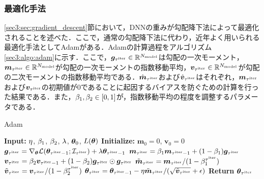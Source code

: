 \documentclass[12pt]{jarticle}
\numberwithin{equation}{section}    %
\numberwithin{figure}{section}      %
\numberwithin{table}{section}      %
\begin{document}
\subsubsection{最適化手法}
\label{sec3:sec:optimizer}
\ref{sec3:sec:gradient_descent}節において，DNNの重みが勾配降下法によって最適化されることを述べた．ここで，通常の勾配降下法に代わり，近年よく用いられる最適化手法としてAdam\cite{kingma2014adam}がある．Adamの計算過程をアルゴリズム\ref{sec3:algo:adam}に示す．ここで，$\bm{g}_{\tau^{\text{iter}}} \in \mathbb{R}^{N_{\text{model}}}$は勾配の一次モーメント，$\bm{m}_{\tau^{\text{iter}}} \in \mathbb{R}^{N_{\text{model}}}$が勾配の一次モーメントの指数移動平均，$\bm{v}_{\tau^{\text{iter}}} \in \mathbb{R}^{N_{\text{model}}}$が勾配の二次モーメントの指数移動平均である．$\hat{\bm{m}}_{\tau^{\text{iter}}}$および$\hat{\bm{v}}_{\tau^{\text{iter}}}$はそれぞれ，$\bm{m}_{\tau^{\text{iter}}}$および$\bm{v}_{\tau^{\text{iter}}}$の初期値が0であることに起因するバイアスを防ぐための計算を行った結果である．また，$\beta_{1}, \beta_{2} \in [0, 1]$が，指数移動平均の程度を調整するパラメータである．
\begin{algorithm}
    \caption{Adam}
    \label{sec3:algo:adam}
    \begin{algorithmic}[1]
        \State \textbf{Input:} $\eta$, $\beta_{1}$, $\beta_{2}$, $\lambda$, $\bm{\theta}_{0}$, $L(\bm{\theta})$
        \State \textbf{Initialize:} $\bm{m}_{0} = 0$, $\bm{v}_{0} = 0$
        \State $\bm{g}_{\tau^{\text{iter}}} = \nabla_{\bm{\theta}} \mathcal{L}(\bm{\theta}_{\tau^{\text{iter}} - 1}; \mathcal{I}_{\tau^{\text{iter}}}) + \lambda \bm{\theta}_{\tau^{\text{iter}}-1}$
        \State $\bm{m}_{\tau^{\text{iter}}} = \beta_{1} \bm{m}_{\tau^{\text{iter}}-1} + (1 - \beta_{1}) \bm{g}_{\tau^{\text{iter}}}$
        \State $\bm{v}_{\tau^{\text{iter}}} = \beta_{2} \bm{v}_{\tau^{\text{iter}}-1} + (1 - \beta_{2}) \bm{g}_{\tau^{\text{iter}}} \odot \bm{g}_{\tau^{\text{iter}}}$
        \State $\tilde{\bm{m}}_{\tau^{\text{iter}}} = \bm{m}_{\tau^{\text{iter}}} / (1 - \beta_{1}^{\tau^{\text{iter}}})$
        \State $\tilde{\bm{v}}_{\tau^{\text{iter}}} = \bm{v}_{\tau^{\text{iter}}} / (1 - \beta_{2}^{\tau^{\text{iter}}})$
        \State $\bm{\theta}_{\tau^{\text{iter}}} = \bm{\theta}_{\tau^{\text{iter}}-1} - \eta \tilde{\bm{m}}_{\tau^{\text{iter}}} / (\sqrt{\tilde{\bm{v}}_{\tau^{\text{iter}}}} + \epsilon)$
        \EndFor
        \State \textbf{Return} $\bm{\theta}_{\tau^{\text{iter}}}$
    \end{algorithmic}
\end{algorithm}
\end{document}
